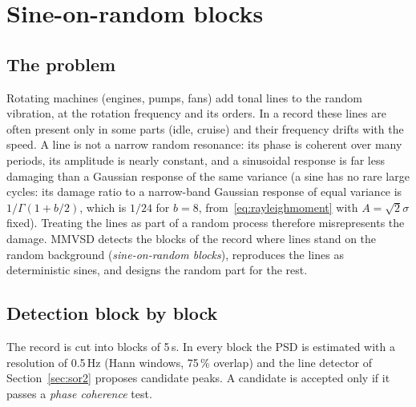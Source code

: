 \section{Sine-on-random blocks}\label{sec:lines}

\subsection{The problem}

Rotating machines (engines, pumps, fans) add tonal lines to the random vibration, at the rotation
frequency and its orders. In a record these lines are often present only in some parts (idle, cruise)
and their frequency drifts with the speed. A line is not a narrow random resonance: its phase is
coherent over many periods, its amplitude is nearly constant, and a sinusoidal response is far less
damaging than a Gaussian response of the same variance (a sine has no rare large cycles: its damage
ratio to a narrow-band Gaussian response of equal variance is $1/\Gamma(1+b/2)$, which is $1/24$ for
$b=8$, from~\eqref{eq:rayleighmoment} with $A = \sqrt2\sigma$ fixed). Treating the lines as part of a
random process therefore misrepresents the damage. MMVSD detects the blocks of the record where lines
stand on the random background (\emph{sine-on-random blocks}), reproduces the lines as deterministic
sines, and designs the random part for the rest.

\subsection{Detection block by block}

The record is cut into blocks of 5\,s. In every block the PSD is estimated with a resolution of
0.5\,Hz (Hann windows, 75\,\% overlap) and the line detector of Section~\ref{sec:sor2} proposes
candidate peaks. A candidate is accepted only if it passes a \emph{phase coherence} test.

